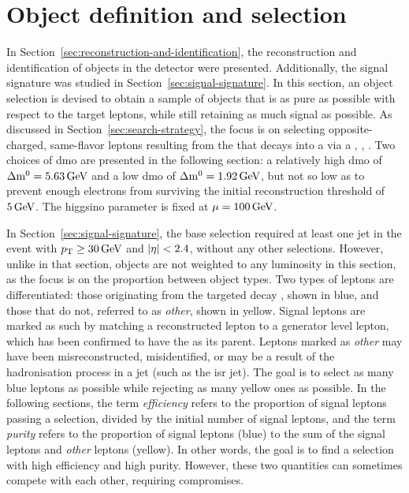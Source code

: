 \clearpage
\section{Object definition and selection}
\label{sec:object-selection}

In Section~\ref{sec:reconstruction-and-identification}, the reconstruction and identification of objects in the detector were presented. Additionally, the signal signature was studied in Section~\ref{sec:signal-signature}. In this section, an object selection is devised to obtain a sample of objects that is as pure as possible with respect to the target leptons, while still retaining as much signal as possible. As discussed in Section~\ref{sec:search-strategy}, the focus is on selecting opposite-charged, same-flavor leptons \ellell resulting from the \neutt that decays into a \neuto via a \PZstar, \ie, \neuttdecay. Two choices of \gls{dmo} are presented in the following section: a relatively high \gls{dmo} of $\Delta\mathrm{m}^0=5.63\,\text{Ge\hspace{-.08em}V}$ and a low \gls{dmo} of $\Delta\mathrm{m}^0=1.92\,\text{Ge\hspace{-.08em}V}$, but not so low as to prevent enough electrons from surviving the initial reconstruction \pt threshold of $5\,\text{Ge\hspace{-.08em}V}$. The higgsino parameter is fixed at $\mu=100\,\text{Ge\hspace{-.08em}V}$.

In Section~\ref{sec:signal-signature}, the base selection required at least one jet in the event with $p_{\mathrm{T}} \geq 30\,\text{Ge\hspace{-.08em}V}$ and $\lvert \eta \rvert<2.4$, without any other selections. However, unlike in that section, objects are not weighted to any luminosity in this section, as the focus is on the proportion between object types. Two types of leptons are differentiated: those originating from the targeted decay \neuttdecay, shown in blue, and those that do not, referred to as \emph{other}, shown in yellow. Signal leptons are marked as such by matching a reconstructed lepton to a generator level lepton, which has been confirmed to have the \neutt as its parent. Leptons marked as \emph{other} may have been misreconstructed, misidentified, or may be a result of the hadronisation process in a jet (such as the \gls{isr} jet). The goal is to select as many blue leptons as possible while rejecting as many yellow ones as possible. In the following sections, the term \emph{efficiency} refers to the proportion of signal leptons passing a selection, divided by the initial number of signal leptons, and the term \emph{purity} refers to the proportion of signal leptons (blue) to the sum of the signal leptons and \emph{other} leptons (yellow). In other words, the goal is to find a selection with high efficiency and high purity. However, these two quantities can sometimes compete with each other, requiring compromises.

